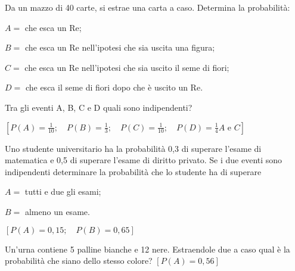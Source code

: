\begin{esercizio}[\Ast]
 \label{ese:9.61}
 Da un mazzo di 40 carte, si estrae una carta a caso. Determina la probabilità:
\begin{itemize*}
\item $ A= $ che esca un Re;
\item $ B= $ che esca un Re nell'ipotesi che sia uscita una figura;
\item $ C= $ che esca un Re nell'ipotesi che sia uscito il seme di fiori;
\item $ D= $ che esca il seme di fiori dopo che è uscito un Re.
\end{itemize*}
Tra gli eventi A, B, C e D quali sono indipendenti?

\hfill $\left[P(A)=\frac 1{10} ; \quad  P(B)=\frac 1 3 ; \quad  P(C)=\frac 
1{10} ; \quad  P(D)=\frac 1 4 A \text{ e } C\right]$
\end{esercizio}

\begin{esercizio}[\Ast]
 \label{ese:9.62}
Uno studente universitario ha la probabilità 0,3 di superare l'esame di 
matematica e 0,5 di superare l'esame di diritto privato. Se i due eventi sono 
indipendenti determinare la probabilità che lo studente ha di superare
\begin{itemize*}
\item $ A= $ tutti e due gli esami;
\item $ B= $ almeno un esame.
\end{itemize*}
\hfill $\left[P(A)=0,15; \quad P(B)=0,65\right]$
\end{esercizio}

\begin{esercizio}[\Ast]
 \label{ese:9.63}
Un'urna contiene 5 palline bianche e 12 nere. Estraendole due a caso qual è la 
probabilità che siano dello stesso colore?
\hfill $\left[P(A)=0,56\right]$
\end{esercizio}

